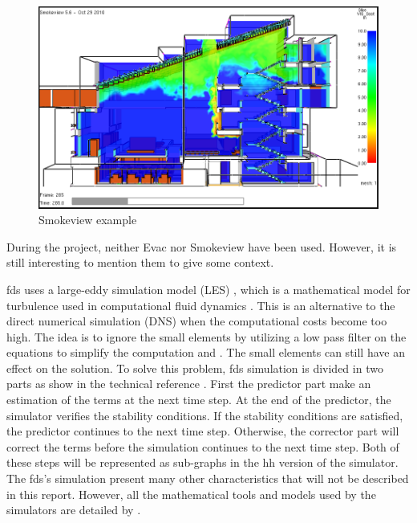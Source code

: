 \begin{figure}[h!]
  \begin{center}
    \includegraphics[scale=0.5]{img/smvexample.png}
    \caption{Smokeview example}
    \label{fig:label}
  \end{center}
\end{figure}

During the project, neither Evac nor Smokeview have been used. However, it is
still interesting to mention them to give some context.

\gls{fds} uses a large-eddy simulation model (LES) \cite{fdsref}, which is a
mathematical model for turbulence used in computational fluid dynamics
\cite{enwiki:les}. This is an alternative to the direct numerical simulation
(DNS) when the computational costs become too high. The idea is to ignore the
small elements by utilizing a low pass filter on the equations to simplify the
computation \cite{enwiki:les} and \cite{ferziger1996large}. The small elements
can still have an effect on the solution. To solve this problem, \gls{fds}
simulation is divided in two parts as show in the technical reference
\cite{fdsref}. First the predictor part make an estimation of the terms at the
next time step. At the end of the predictor, the simulator verifies the
stability conditions. If the stability conditions are satisfied, the predictor
continues to the next time step. Otherwise, the corrector part will correct the
terms before the simulation continues to the next time step. Both of these steps
will be represented as sub-graphs in the \gls{hh} version of the simulator. The
\gls{fds}'s simulation present many other characteristics that will not be
described in this report. However, all the mathematical tools and models used by
the simulators are detailed by \cite{fdsref}.

